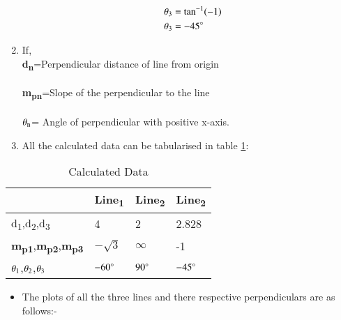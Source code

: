 \documentclass[journal,12pt,twocolumn]{IEEEtran}
\begin{document}
\begin{enumerate}
\begin{itemize}
\begin{align}
    \\
    \theta\textsubscript{3} &=\tan^{-1}(-1)
    \\
 \theta\textsubscript{3} &= -45\degree
\end{align}
\end{itemize}
\item If,
\\
\textbf{d\textsubscript{n}}=Perpendicular distance of line from origin
\\
\\
\textbf{m\textsubscript{pn}}=Slope of the perpendicular to the line 
\\
\\
$\theta\textsubscript{n}$= Angle of perpendicular with positive x-axis.
\\
\item All the calculated data can be tabularised in table  \ref{tab:table2}:
\end{enumerate}
\begin{table}[!ht]
\begin{center}
\begin{tabular}{ | m{2cm} | m{1.2cm}| m{1.2cm} | m{1.2cm} |} 
\hline
 & Line\textsubscript{1} & Line\textsubscript{2} & Line\textsubscript{2} \\
\hline
d\textsubscript{1},d\textsubscript{2},d\textsubscript{3} & 4 & 2 & 2.828 \\ 
\hline
\textbf{m\textsubscript{p1}},\textbf{m\textsubscript{p2}},\textbf{m\textsubscript{p3}} & $-\sqrt{3}$ & $\infty$ & -1 \\ 
\hline
$\theta\textsubscript{1}$,$\theta\textsubscript{2}$,$\theta\textsubscript{3}$& $-60\degree$ & $90\degree$ & $-45\degree$ \\ 
\hline
\end{tabular}
\end{center}
\caption{Calculated Data}
\label{tab:table2}
\end{table}

\begin{itemize}
    \item The plots of all the three lines and there respective perpendiculars are as follows:-
\end{itemize}
\end{document}
